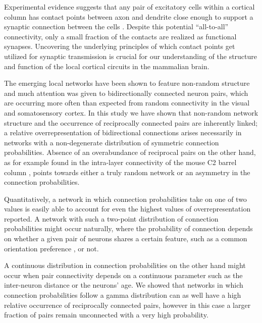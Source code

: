 

Experimental evidence suggests that any pair of excitatory cells within a cortical column has contact points between axon and dendrite close enough to support a synaptic connection between the cells \cite{Stepanyants2004,Kalisman2005}.
%
Despite this potential \enquote{all-to-all} connectivity, only a small fraction of the contacts are realized as functional synapses.
%
Uncovering the underlying principles of which contact points get utilized for synaptic transmission is crucial for our understanding of the structure and function of the local cortical circuits in the mammalian brain.


The emerging local networks have been shown to feature non-random structure and much attention was given to bidirectionally connected neuron pairs, which are occurring more often than expected from random connectivity in the visual and somatosensory cortex.
%
In this study we have shown that non-random network structure and the occurrence of reciprocally connected pairs are inherently linked; a relative overrepresentation of bidirectional connections arises necessarily in networks with a non-degenerate distribution of symmetric connection probabilities.
%
Absence of an overabundance of reciprocal pairs on the other hand, as for example found in the intra-layer connectivity of the mouse C2 barrel column \cite{Lefort2009}, points towards either a truly random network or an asymmetry in the connection probabilities. 


Quantitatively, a network in which connection probabilities take on one of two values is easily able to account for even the highest values of overrepresentation reported.
%
A network with such a two-point distribution of connection probabilities might occur naturally, where the probability of connection depends on whether a given pair of neurons shares a certain feature, such as a common orientation preference \cite{Lee2016}, or not.


A continuous distribution in connection probabilities on the other hand might occur when pair connectivity depends on a continuous parameter such as the inter-neuron distance or the neurons' age.
%
We showed that networks in which connection probabilities follow a gamma distribution can as well have a high relative occurrence of reciprocally connected pairs, however in this case a larger fraction of pairs remain unconnected with a very high probability.


